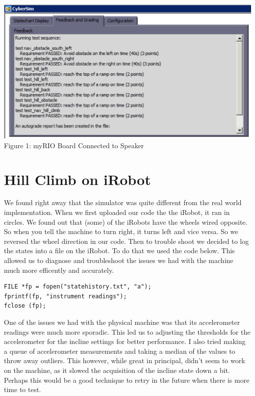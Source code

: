 \documentclass[twoside]{article}
\begin{document}
\begin{center}
\includegraphics*[width = 15cm]{FIG1.png}\\
Figure 1: myRIO Board Connected to Speaker
\end{center}


\section{Hill Climb on iRobot}

We found right away that the simulator was quite different from the real world implementation. When we first uploaded our code the the iRobot, it ran in circles. We found out that (some) of the iRobots have the wheels wired opposite. So when you tell the machine to turn right, it turns left and vice versa. So we reversed the wheel direction in our code. Then to trouble shoot we decided to log the states into a file on the iRobot. To do that we used the code below. This allowed us to diagnose and troubleshoot the issues we had with the machine much more efficently and accurately.

\vspace{6mm}
\begin{lstlisting}[mathescape, frame=single]
FILE *fp = fopen("statehistory.txt", "a");
fprintf(fp, "instrument readings");
fclose (fp);
\end{lstlisting}

One of the issues we had with the physical machine was that its accelerometer readings were much more sporadic. This led us to adjusting the thresholds for the accelerometer for the incline settings for better performance. I also tried making a queue of accelerometer measurements and taking a median of the values to throw away outliers. This however, while great in principal, didn't seem to work on the machine, as it slowed the acquisition of the incline state down a bit. Perhaps this would be a good technique to retry in the future when there is more time to test.
\end{document}
